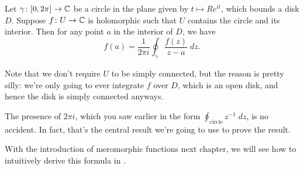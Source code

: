 \begin{theorem}
	\label{thm:cauchy_integral_formula}
	Let $\gamma \colon [0,2\pi] \to \mathbb C$ be a circle in the plane given by $t \mapsto Re^{it}$,
	which bounds a disk $D$.
	Suppose $f \colon U \to \mathbb C$ is holomorphic such that $U$ contains the circle and its interior.
	Then for any point $a$ in the interior of $D$, we have
	\[
		f(a)
		=
		\frac{1}{2\pi i} \oint_\gamma \frac{f(z)}{z-a} \; dz.
	\]
\end{theorem}
Note that we don't require $U$ to be simply connected, but the reason is pretty silly:
we're only going to ever integrate $f$ over $D$, which is an open disk, and hence the disk
is simply connected anyways.

The presence of $2\pi i$, which you saw earlier in the form $\oint_{\text{circle}} z^{-1} \; dz$,
is no accident.
In fact, that's the central result we're going to use to prove the result.

\begin{remark}
	With the introduction of meromorphic functions next chapter, we will see how to intuitively
	derive this formula in .
\end{remark}

